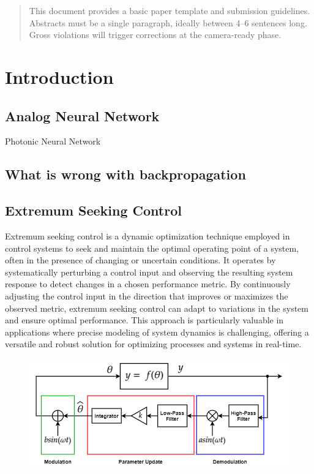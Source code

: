 \documentclass[nohyperref]{article}
\theoremstyle{plain}
\theoremstyle{definition}
\theoremstyle{remark}
\begin{document}
\printAffiliationsAndNotice{}  %

\begin{abstract}
This document provides a basic paper template and submission guidelines.
Abstracts must be a single paragraph, ideally between 4--6 sentences long.
Gross violations will trigger corrections at the camera-ready phase.
\end{abstract}

\section{Introduction}
\subsection{Analog Neural Network}

Photonic Neural Network \cite{Pai_2023}
\subsection{What is wrong with backpropagation}
\subsection{Extremum Seeking Control}
Extremum seeking control is a dynamic optimization technique employed in control systems to seek and maintain the optimal operating point of a system, often in the presence of changing or uncertain conditions. It operates by systematically perturbing a control input and observing the resulting system response to detect changes in a chosen performance metric. By continuously adjusting the control input in the direction that improves or maximizes the observed metric, extremum seeking control can adapt to variations in the system and ensure optimal performance. This approach is particularly valuable in applications where precise modeling of system dynamics is challenging, offering a versatile and robust solution for optimizing processes and systems in real-time.


\begin{figure}[ht]
\vskip 0.2in
\begin{center}
\centerline{\includegraphics[width=\columnwidth]{images/esc_static_optimization.png}}
\caption{}
\end{center}
\vskip -0.2in
\end{figure}
\end{document}
